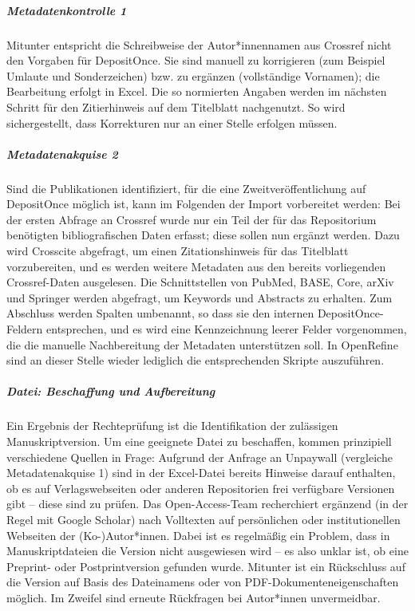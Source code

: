 \documentclass[a4paper,
fontsize=11pt,
oneside,
numbers=noperiodatend,
parskip=half-,
bibliography=totoc,
final
]{scrartcl}
\begin{document}
\hypertarget{metadatenkontrolle-1}{%
\subparagraph{Metadatenkontrolle 1}\label{metadatenkontrolle-1}}

Mitunter entspricht die Schreibweise der Autor*innennamen aus Crossref
nicht den Vorgaben für DepositOnce. Sie sind manuell zu korrigieren (zum
Beispiel Umlaute und Sonderzeichen) bzw. zu ergänzen (vollständige
Vornamen); die Bearbeitung erfolgt in Excel. Die so normierten Angaben
werden im nächsten Schritt für den Zitierhinweis auf dem Titelblatt
nachgenutzt. So wird sichergestellt, dass Korrekturen nur an einer
Stelle erfolgen müssen.

\hypertarget{metadatenakquise-2}{%
\subparagraph{Metadatenakquise 2}\label{metadatenakquise-2}}

Sind die Publikationen identifiziert, für die eine Zweitveröffentlichung
auf DepositOnce möglich ist, kann im Folgenden der Import vorbereitet
werden: Bei der ersten Abfrage an Crossref wurde nur ein Teil der für
das Repositorium benötigten bibliografischen Daten erfasst; diese sollen
nun ergänzt werden. Dazu wird Crosscite abgefragt, um einen
Zitationshinweis für das Titelblatt vorzubereiten, und es werden weitere
Metadaten aus den bereits vorliegenden Crossref-Daten ausgelesen. Die
Schnittstellen von PubMed, BASE, Core, arXiv und Springer werden
abgefragt, um Keywords und Abstracts zu erhalten. Zum Abschluss werden
Spalten umbenannt, so dass sie den internen DepositOnce-Feldern
entsprechen, und es wird eine Kennzeichnung leerer Felder vorgenommen,
die die manuelle Nachbereitung der Metadaten unterstützen soll. In
OpenRefine sind an dieser Stelle wieder lediglich die entsprechenden
Skripte auszuführen.

\hypertarget{datei-beschaffung-und-aufbereitung}{%
\subparagraph{Datei: Beschaffung und
Aufbereitung}\label{datei-beschaffung-und-aufbereitung}}

Ein Ergebnis der Rechteprüfung ist die Identifikation der zulässigen
Manuskriptversion. Um eine geeignete Datei zu beschaffen, kommen
prinzipiell verschiedene Quellen in Frage: Aufgrund der Anfrage an
Unpaywall (vergleiche Metadatenakquise 1) sind in der Excel-Datei
bereits Hinweise darauf enthalten, ob es auf Verlagswebseiten oder
anderen Repositorien frei verfügbare Versionen gibt -- diese sind zu
prüfen. Das Open-Access-Team recherchiert ergänzend (in der Regel mit
Google Scholar) nach Volltexten auf persönlichen oder institutionellen
Webseiten der (Ko-)Autor*innen. Dabei ist es regelmäßig ein Problem,
dass in Manuskriptdateien die Version nicht ausgewiesen wird -- es also
unklar ist, ob eine Preprint- oder Postprintversion gefunden wurde.
Mitunter ist ein Rückschluss auf die Version auf Basis des Dateinamens
oder von PDF-Dokumenteneigenschaften möglich. Im Zweifel sind erneute
Rückfragen bei Autor*innen unvermeidbar.
\end{document}
